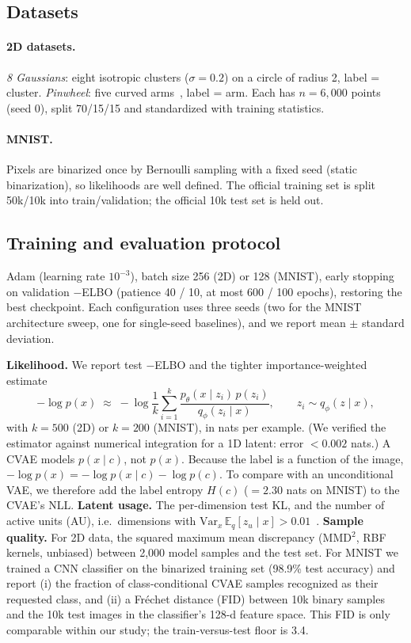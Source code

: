 \documentclass[10pt]{article}
\begin{document}
\subsection{Datasets}
\paragraph{2D datasets.} \emph{8 Gaussians}: eight isotropic clusters
($\sigma=0.2$) on a circle of radius 2, label = cluster. \emph{Pinwheel}: five
curved arms~\cite{johnson2016}, label = arm. Each has $n=6{,}000$ points
(seed 0), split 70/15/15 and standardized with training statistics.
\paragraph{MNIST.} Pixels are binarized once by Bernoulli sampling with a fixed
seed (static binarization), so likelihoods are well defined. The official
training set is split 50k/10k into train/validation; the official 10k test
set is held out.

\subsection{Training and evaluation protocol}
Adam (learning rate $10^{-3}$), batch size 256 (2D) or 128 (MNIST), early
stopping on validation $-$ELBO (patience 40 / 10, at most 600 / 100 epochs),
restoring the best checkpoint. Each configuration uses three seeds
(two for the MNIST architecture sweep, one for single-seed baselines), and we
report mean $\pm$ standard deviation.

\textbf{Likelihood.} We report test $-$ELBO and the tighter importance-weighted
estimate~\cite{burda2016}
\begin{equation}
  -\log p(x)\;\approx\;-\log\frac1k\sum_{i=1}^k
  \frac{p_\theta(x\mid z_i)\,p(z_i)}{q_\phi(z_i\mid x)},\qquad z_i\sim q_\phi(z\mid x),
\end{equation}
with $k=500$ (2D) or $k=200$ (MNIST), in nats per example. (We verified the
estimator against numerical integration for a 1D latent: error
$<0.002$ nats.) A CVAE models $p(x\mid c)$, not $p(x)$. Because the label is
a function of the image, $-\log p(x)=-\log p(x\mid c)-\log p(c)$. To compare
with an unconditional VAE, we therefore add the label entropy $H(c)$
($=2.30$ nats on MNIST) to the CVAE's NLL. \textbf{Latent usage.} The per-dimension test KL, and the
number of active units (AU), i.e.\ dimensions with
$\mathrm{Var}_x\,\mathbb E_q[z_u\mid x]>0.01$~\cite{burda2016}.
\textbf{Sample quality.} For 2D data, the squared maximum mean discrepancy
(MMD$^2$, RBF kernels, unbiased) between 2{,}000 model samples and the test
set. For MNIST we trained a CNN classifier on the binarized training set
(98.9\% test accuracy) and report (i) the fraction of class-conditional CVAE
samples recognized as their requested class, and (ii) a Fr\'echet distance
(FID) between 10k binary samples and the 10k test images in the classifier's
128-d feature space. This FID is only comparable within our study; the
train-versus-test floor is 3.4.
\end{document}
